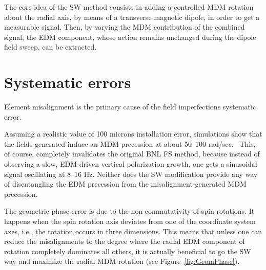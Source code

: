 \documentclass{article}
\begin{document}
The core idea of the SW method consists in adding a controlled MDM rotation about the radial axis, by means of a transverse magnetic dipole, in order to get a measurable signal. Then, by varying the MDM contribution of the combined signal, the EDM component, whose action remains unchanged during the dipole field sweep, can be extracted.

\section{Systematic errors}
Element misalignment is the primary cause of the field imperfections systematic error.~\cite[p. 24]{BNL_proposal}

Assuming a realistic value of 100 microns installation error, simulations show that the fields generated induce an MDM precession at about 50--100 rad/sec.~\cite{Senichev:FDM} This, of course, completely invalidates the original BNL FS method, because instead of observing a slow, EDM-driven vertical polarization growth, one gets a sinusoidal signal oscillating at 8--16 Hz. Neither does the SW modification provide any way of disentangling the EDM precession from the misalignment-generated MDM precession.

The geometric phase error is due to the non-commutativity of spin rotations. It happens when the spin rotation axis deviates from one of the coordinate system axes, i.e., the rotation occurs in three dimensions. This means that unless one can reduce the misalignments to the degree where the radial EDM component of rotation completely dominates all others, it is actually beneficial to go the SW way and maximize the radial MDM rotation (see Figure~\ref{fig:GeomPhase}).
\end{document}
